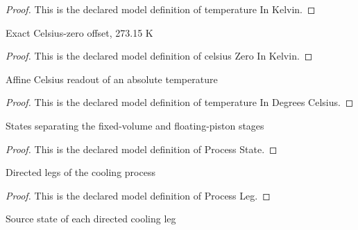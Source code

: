 \begin{proof}
  This is the declared model definition of temperature In Kelvin.
\end{proof}
\begin{definition}
  \label{def:physics:phyx-mini-0462:phyxminiproblems-problemphyxmini0462-celsiuszeroinkelvin}
  Exact Celsius-zero offset, 273.15 K
\end{definition}
\begin{proof}
  This is the declared model definition of celsius Zero In Kelvin.
\end{proof}
\begin{definition}
  \label{def:physics:phyx-mini-0462:phyxminiproblems-problemphyxmini0462-temperatureindegreescelsius}
  Affine Celsius readout of an absolute temperature
\end{definition}
\begin{proof}
  This is the declared model definition of temperature In Degrees Celsius.
\end{proof}
\begin{definition}
  \label{def:physics:phyx-mini-0462:phyxminiproblems-problemphyxmini0462-processstate}
  States separating the fixed-volume and floating-piston stages
\end{definition}
\begin{proof}
  This is the declared model definition of Process State.
\end{proof}
\begin{definition}
  \label{def:physics:phyx-mini-0462:phyxminiproblems-problemphyxmini0462-processleg}
  Directed legs of the cooling process
\end{definition}
\begin{proof}
  This is the declared model definition of Process Leg.
\end{proof}
\begin{definition}
  \label{def:physics:phyx-mini-0462:phyxminiproblems-problemphyxmini0462-legsource}
  Source state of each directed cooling leg
\end{definition}
